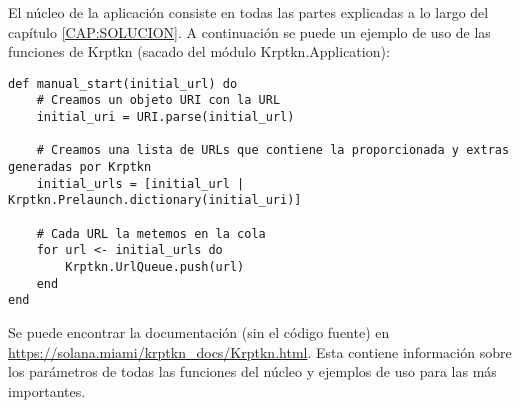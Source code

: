 El núcleo de la aplicación consiste en todas las partes explicadas a lo largo del capítulo \ref{CAP:SOLUCION}. A continuación se puede un ejemplo de uso de las funciones de Krptkn (sacado del módulo Krptkn.Application):

\begin{verbatim}
def manual_start(initial_url) do
    # Creamos un objeto URI con la URL
    initial_uri = URI.parse(initial_url)
    
    # Creamos una lista de URLs que contiene la proporcionada y extras generadas por Krptkn
    initial_urls = [initial_url | Krptkn.Prelaunch.dictionary(initial_uri)]

    # Cada URL la metemos en la cola
    for url <- initial_urls do
        Krptkn.UrlQueue.push(url)
    end
end
\end{verbatim}

Se puede encontrar la documentación (sin el código fuente) en \url{https://solana.miami/krptkn_docs/Krptkn.html}. Esta contiene información sobre los parámetros de todas las funciones del núcleo y ejemplos de uso para las más importantes.